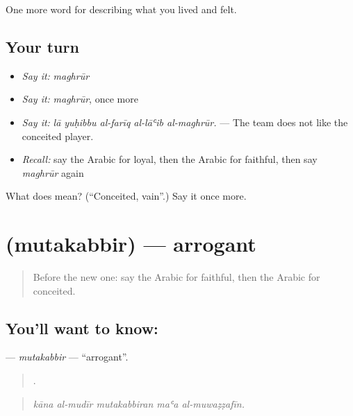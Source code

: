 \begin{grammarlens}[title={What you've built}]
One more word for describing what you lived and felt.
\end{grammarlens}

\subsection*{Your turn}
\begin{itemize}
\raggedright
  \item \emph{Say it:} \emph{maghrūr}
  \item \emph{Say it:} \emph{maghrūr}, once more
  \item \emph{Say it:} \emph{lā yuḥibbu al-farīq al-lāʿib al-maghrūr.} — The team does not like the conceited player.
  \item \emph{Recall:} say the Arabic for loyal, then the Arabic for faithful, then say \emph{maghrūr} again
\end{itemize}

\begin{tcolorbox}[breakable,colback=teal!4,colframe=teal!35!black,title={Before you move on}]
What does  mean? (\textquotedblleft{}Conceited, vain\textquotedblright{}.) Say it once more.
\end{tcolorbox}
\section[\texorpdfstring{\ar{متكبر} (mutakabbir)}{متكبر (mutakabbir)}]{ (mutakabbir) — arrogant}

\label{lesson:AR-C500-mutakabbir}



\begin{quote}
Before the new one: say the Arabic for faithful, then the Arabic for conceited.
\end{quote}

\subsection*{You'll want to know: }
\textbf{} — \emph{mutakabbir} — \textquotedblleft{}arrogant\textquotedblright{}.

\begin{quote}
    .
\end{quote}

\begin{quote}
\emph{kāna al-mudīr mutakabbiran maʿa al-muwaẓẓafīn.}
\end{quote}

